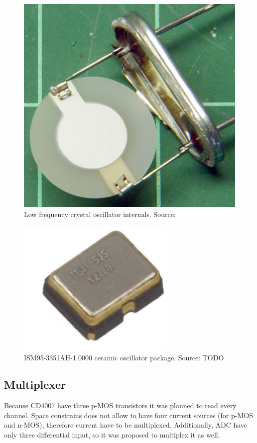         \begin{figure}[H]
            \centering
            \includegraphics[width=0.5\paperwidth]{img/06/crystal.png}
            \caption{Low frequency crystal oscillator internals. Source: \cite{        Opening_a_Quartz_Crystal_Can_Effects_Thereof}}
            \label{Opening_a_Quartz_Crystal_Can_Effects_Thereof}
        \end{figure}

        \begin{figure}[H]
            \centering
            \includegraphics[width=0.5\paperwidth]{img/06/ISM95.png}
            \caption{ISM95-3351AH-1.0000 ceramic oscillator package. Source: TODO}
            \label{ISM95-3351AH-1.0000}
        \end{figure}


    \subsection{Multiplexer}
        Because CD4007 have three p-MOS transistors it was planned to read every channel. Space constrains does not allow to have four current sources (for p-MOS and n-MOS), therefore current have to be multiplexed. Additionally, ADC have only three differential input, so it was proposed to multiplex it as well.

